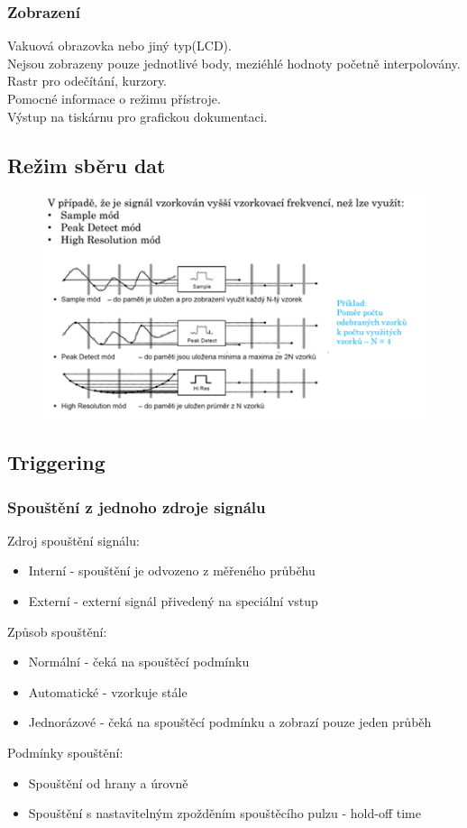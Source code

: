 \subsubsection*{Zobrazení}
Vakuová obrazovka nebo jiný typ(LCD).\\
Nejsou zobrazeny pouze jednotlivé body, meziéhlé hodnoty početně interpolovány.\\
Rastr pro odečítání, kurzory.\\
Pomocné informace o režimu přístroje.\\
Výstup na tiskárnu pro grafickou dokumentaci.\\

\subsection*{Režim sběru dat}
\begin{figure}[H]
    \includegraphics*[scale = 1.2]{images/rezimSberuDat.png}
\end{figure}

\subsection*{Triggering}
\subsubsection*{Spouštění z jednoho zdroje signálu}
Zdroj spouštění signálu:
\begin{itemize}
    \item Interní - spouštění je odvozeno z měřeného průběhu 
    \item Externí - externí signál přivedený na speciální vstup 
\end{itemize}
Způsob spouštění:
\begin{itemize}
    \item Normální - čeká na spouštěcí podmínku
    \item Automatické - vzorkuje stále
    \item Jednorázové - čeká na spouštěcí podmínku a zobrazí pouze jeden průběh 
\end{itemize}
Podmínky spouštění:
\begin{itemize}
    \item Spouštění od hrany a úrovně
    \item Spouštění s nastavitelným zpožděním spouštěcího pulzu - hold-off time
\end{itemize}

